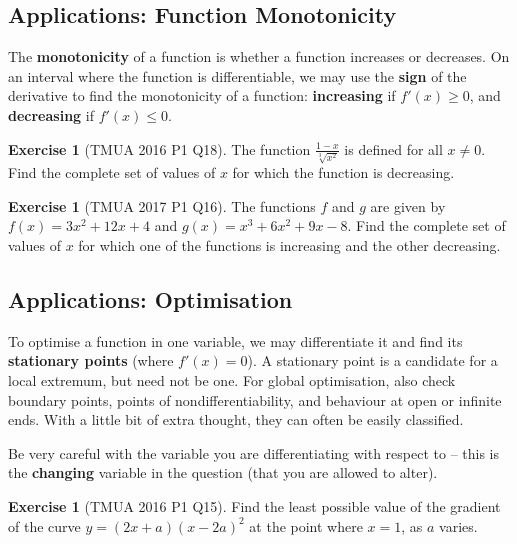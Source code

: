 \documentclass[11pt]{article}
\theoremstyle{definition}
\newtheorem{example}[theorem]{Exercise}
\theoremstyle{remark}
\newcommand{\pqty}[1]{\left(#1\right)}
\begin{document}
\subsection{Applications: Function Monotonicity}\label{tmua-4-subsection-006}

The \textbf{monotonicity} of a function is whether a function increases or decreases. On an interval where the function is differentiable, we may use the \textbf{sign} of the derivative to find the monotonicity of a function: \textbf{increasing} if \(f'\pqty{x} \geq 0\), and \textbf{decreasing} if \(f'\pqty{x} \leq 0\).

\begin{example}[TMUA 2016 P1 Q18]\label{tmua-4-unit-021}
    The function \(\frac{1 - x}{\sqrt[3]{x^2}}\) is defined for all \(x \neq 0\). Find the complete set of values of \(x\) for which the function is decreasing.
\end{example}

\begin{example}[TMUA 2017 P1 Q16]\label{tmua-4-unit-022}
    The functions \(f\) and \(g\) are given by \(f\pqty{x} = 3 x^2 + 12 x + 4\) and \(g\pqty{x} = x^3 + 6 x^2 + 9x - 8\). Find the complete set of values of \(x\) for which one of the functions is increasing and the other decreasing.
\end{example}

\subsection{Applications: Optimisation}\label{tmua-4-subsection-007}

To optimise a function in one variable, we may differentiate it and find its \textbf{stationary points} (where \(f'\pqty{x} = 0\)). A stationary point is a candidate for a local extremum, but need not be one. For global optimisation, also check boundary points, points of nondifferentiability, and behaviour at open or infinite ends. With a little bit of extra thought, they can often be easily classified.

Be very careful with the variable you are differentiating with respect to -- this is the \textbf{changing} variable in the question (that you are allowed to alter).

\begin{example}[TMUA 2016 P1 Q15]\label{tmua-4-unit-023}
    Find the least possible value of the gradient of the curve \(y = \pqty{2x + a} \pqty{x - 2a}^2\) at the point where \(x = 1\), as \(a\) varies.
\end{example}
\end{document}
